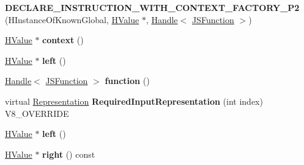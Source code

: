 \begin{DoxyCompactItemize}
\item 
\hypertarget{classv8_1_1internal_1_1_v8___f_i_n_a_l_ae95c44dda59202c8c5c7f976b2a5b478}{}{\bfseries D\+E\+C\+L\+A\+R\+E\+\_\+\+I\+N\+S\+T\+R\+U\+C\+T\+I\+O\+N\+\_\+\+W\+I\+T\+H\+\_\+\+C\+O\+N\+T\+E\+X\+T\+\_\+\+F\+A\+C\+T\+O\+R\+Y\+\_\+\+P2} (H\+Instance\+Of\+Known\+Global, \hyperlink{classv8_1_1internal_1_1_h_value}{H\+Value} $\ast$, \hyperlink{classv8_1_1internal_1_1_handle}{Handle}$<$ \hyperlink{classv8_1_1internal_1_1_j_s_function}{J\+S\+Function} $>$)\label{classv8_1_1internal_1_1_v8___f_i_n_a_l_ae95c44dda59202c8c5c7f976b2a5b478}

\item 
\hypertarget{classv8_1_1internal_1_1_v8___f_i_n_a_l_a911a04b75b22f133c5eb5eafcc2d5f87}{}\hyperlink{classv8_1_1internal_1_1_h_value}{H\+Value} $\ast$ {\bfseries context} ()\label{classv8_1_1internal_1_1_v8___f_i_n_a_l_a911a04b75b22f133c5eb5eafcc2d5f87}

\item 
\hypertarget{classv8_1_1internal_1_1_v8___f_i_n_a_l_abcb43ce9151953e6e5a2d50314bcc7d4}{}\hyperlink{classv8_1_1internal_1_1_h_value}{H\+Value} $\ast$ {\bfseries left} ()\label{classv8_1_1internal_1_1_v8___f_i_n_a_l_abcb43ce9151953e6e5a2d50314bcc7d4}

\item 
\hypertarget{classv8_1_1internal_1_1_v8___f_i_n_a_l_a75915f6d1df9c5fd892c846da3c34f23}{}\hyperlink{classv8_1_1internal_1_1_handle}{Handle}$<$ \hyperlink{classv8_1_1internal_1_1_j_s_function}{J\+S\+Function} $>$ {\bfseries function} ()\label{classv8_1_1internal_1_1_v8___f_i_n_a_l_a75915f6d1df9c5fd892c846da3c34f23}

\item 
\hypertarget{classv8_1_1internal_1_1_v8___f_i_n_a_l_a6c6d1f37f40b113d8f4062f1ffff7215}{}virtual \hyperlink{classv8_1_1internal_1_1_representation}{Representation} {\bfseries Required\+Input\+Representation} (int index) V8\+\_\+\+O\+V\+E\+R\+R\+I\+D\+E\label{classv8_1_1internal_1_1_v8___f_i_n_a_l_a6c6d1f37f40b113d8f4062f1ffff7215}

\item 
\hypertarget{classv8_1_1internal_1_1_v8___f_i_n_a_l_abcb43ce9151953e6e5a2d50314bcc7d4}{}\hyperlink{classv8_1_1internal_1_1_h_value}{H\+Value} $\ast$ {\bfseries left} ()\label{classv8_1_1internal_1_1_v8___f_i_n_a_l_abcb43ce9151953e6e5a2d50314bcc7d4}

\item 
\hypertarget{classv8_1_1internal_1_1_v8___f_i_n_a_l_aa820a93e98abae50a42efd4cad745c15}{}\hyperlink{classv8_1_1internal_1_1_h_value}{H\+Value} $\ast$ {\bfseries right} () const \label{classv8_1_1internal_1_1_v8___f_i_n_a_l_aa820a93e98abae50a42efd4cad745c15}


\end{DoxyCompactItemize}
